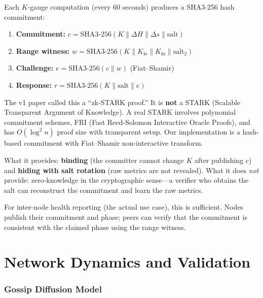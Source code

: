 \documentclass[11pt,a4paper]{article}
\begin{document}
Each $K$-gauge computation (every 60 seconds) produces a SHA3-256 hash commitment:

\begin{enumerate}[nosep]
    \item \textbf{Commitment:} $c = \text{SHA3-256}(K \| \Delta H \| \Delta s \| \text{salt})$
    \item \textbf{Range witness:} $w = \text{SHA3-256}(K \| K_{\text{lo}} \| K_{\text{hi}} \| \text{salt}_2)$
    \item \textbf{Challenge:} $e = \text{SHA3-256}(c \| w)$ (Fiat--Shamir)
    \item \textbf{Response:} $r = \text{SHA3-256}(K \| \text{salt} \| e)$
\end{enumerate}

\begin{honesty}
The v1 paper called this a ``zk-STARK proof.'' It is \textbf{not} a STARK (Scalable Transparent Argument of Knowledge). A real STARK involves polynomial commitment schemes, FRI (Fast Reed-Solomon Interactive Oracle Proofs), and has $O(\log^2 n)$ proof size with transparent setup. Our implementation is a hash-based commitment with Fiat--Shamir non-interactive transform.

What it provides: \textbf{binding} (the committer cannot change $K$ after publishing $c$) and \textbf{hiding with salt rotation} (raw metrics are not revealed). What it does \emph{not} provide: zero-knowledge in the cryptographic sense---a verifier who obtains the salt can reconstruct the commitment and learn the raw metrics.

For inter-node health reporting (the actual use case), this is sufficient. Nodes publish their commitment and phase; peers can verify that the commitment is consistent with the claimed phase using the range witness.
\end{honesty}

\part{Network Dynamics and Validation}

\section{Gossip Diffusion Model}
\end{document}
